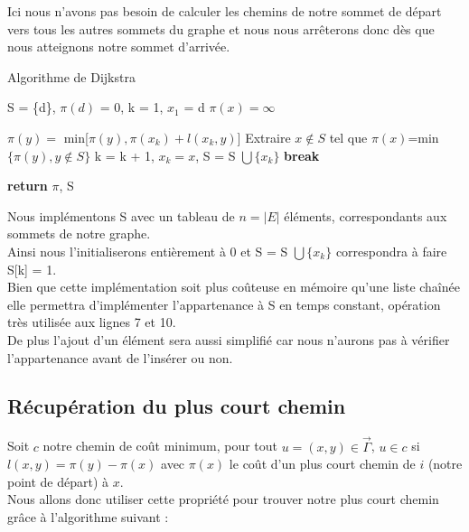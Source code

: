 \documentclass{article}
\begin{document}
Ici nous n'avons pas besoin de calculer les chemins de notre sommet de départ
vers tous les autres sommets du graphe et nous nous arrêterons donc dès
que nous atteignons notre sommet d'arrivée.

\begin{algorithm}
\caption{Algorithme de Dijkstra}\label{dijkstra}
\begin{algorithmic}[1]
	\State S = \{d\}, $\pi(d)$ = 0, k = 1, $x_1$ = d
		\State $\pi(x) = \infty$
	\EndFor
	
			\State $\pi(y) = $ min[$\pi(y), \pi(x_k) + l(x_k, y)$]
		\EndFor
		\State Extraire $x \not\in S$ tel que $\pi(x)$=min$\{\pi(y), y \not\in S\}$
		\State k = k + 1, $x_k = x$, S = S $\bigcup \{x_k\}$
			\State \textbf{break}
		\EndIf
	\EndWhile
	
	\State \textbf{return} $\pi$, S
\EndProcedure
\end{algorithmic}
\end{algorithm}

Nous implémentons S avec un tableau de $n = \vert E\vert$ éléments, correspondants aux sommets 
de notre graphe.\\
Ainsi nous l'initialiserons entièrement à 0 et S = S $\bigcup \{x_k\}$
correspondra à faire S[k] = 1.\\
Bien que cette implémentation soit plus coûteuse en mémoire qu'une liste chaînée
elle permettra d'implémenter l'appartenance à S en temps constant, opération très
utilisée aux lignes 7 et 10.\\
De plus l'ajout d'un élément sera aussi simplifié car nous n'aurons pas à vérifier
l'appartenance avant de l'insérer ou non.\\

\subsection{Récupération du plus court chemin}


Soit $c$ notre chemin de coût minimum, pour tout $u = (x,y) \in \vec{\Gamma}$, $ u \in c$ si 
$l(x,y) = \pi (y) - \pi (x)$ avec $\pi(x)$ le coût d'un plus court chemin de $i$ (notre point de départ)
à $x$.\\

Nous allons donc utiliser cette propriété pour trouver notre plus court chemin grâce à
l'algorithme suivant :\\
\end{document}
